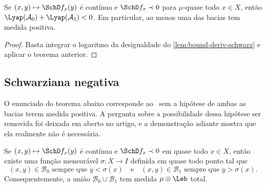 \documentclass[../fapesp0]{subfiles}
\begin{document}
\begin{corollary}\label{cor:schwarz-basin-pos-meas}
  Se \((x,y) \mapsto \SchD f_x(y)\) é contínua e \(\SchD f_x \prec 0\) para \(\mu\)-quase todo \(x \in X\), então \( \Lyap(\mathcal{A}_0) + \Lyap(\mathcal{A}_1) < 0\).
  Em particular, ao menos uma das bacias tem medida positiva.
\end{corollary}

\begin{proof}
  Basta integrar o logaritmo da desigualdade do \cref{lem:bound-deriv-schwarz} e aplicar o teorema anterior.
\end{proof}

\subsection{Schwarziana negativa}

O enunciado do teorema abaixo corresponde ao~\cite[teorema 3.2]{bonifantSchwarzianDerivativesCylinder2008} sem a hipótese de ambas as bacias terem medida positiva. A pergunta sobre a possibilidade dessa hipótese ser removida foi deixada em aberto no artigo, e a demonstração adiante mostra que ela realmente não é necessária.

\begin{theorem}\label{thm:inv-graph}
  Se \((x,y) \mapsto \SchD f_x(y)\) é contínua e \(\SchD f_x \prec 0\) em quase todo \(x \in X\), então existe uma função mensurável \(\sigma \colon X \to I\) definida em quase todo ponto tal que
  \begin{equation*}
    (x,y) \in \mathcal{B}_0 \text{ sempre que } y < \sigma(x) \quad \text{e} \quad (x,y) \in \mathcal{B}_1 \text{ sempre que }y > \sigma(x).
  \end{equation*}
  Consequentemente, a união \(\mathcal{B}_0 \cup \mathcal{B}_1\) tem medida \(\mu \otimes \Leb\) total.
\end{theorem}
\end{document}
